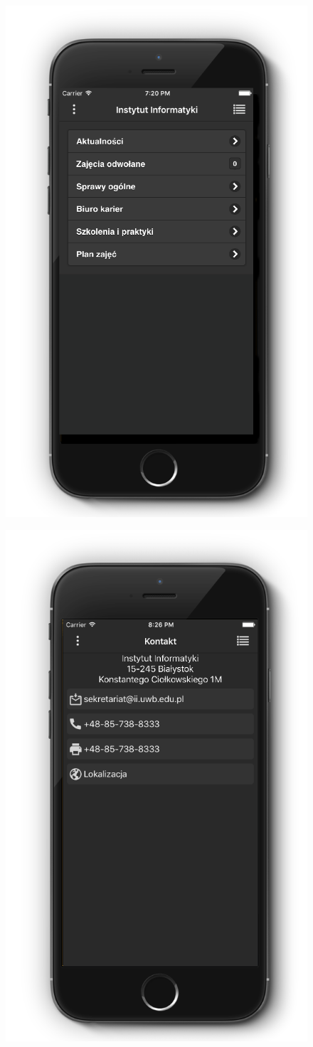 \documentclass{iiuwb}
\begin{document}
\begin{figure}
\centering
\begin{minipage}{.5\textwidth}
  \centering
  \includegraphics[width=.6\linewidth]{image/HomeIphone.png}
  \label{fig:Home}
\end{minipage}%
\begin{minipage}{.5\textwidth}
  \centering
  \includegraphics[width=.6\linewidth]{image/KontaktIphone.png}
  \label{fig:Kontakt}
\end{minipage}
\end{figure}
\end{document}
